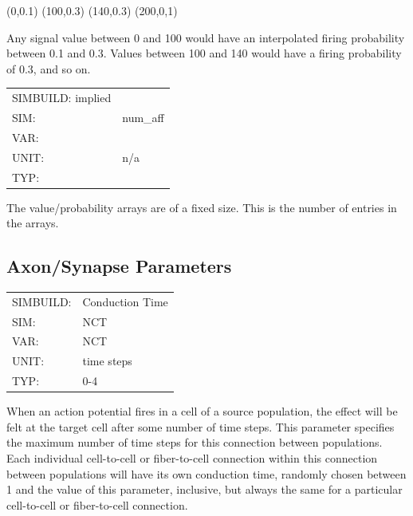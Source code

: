 \documentclass[12pt,openany,oneside]{book}
\begin{document}
(0,0.1) (100,0.3) (140,0.3) (200,0,1)

Any signal value between 0 and 100 would have an interpolated firing
probability between 0.1 and 0.3. Values between 100 and 140 would have 
a firing probability of 0.3, and so on.

\begin{flushleft}
\begin{tabular}{@{}ll@{}}
SIMBUILD: implied\\
SIM: & num\_aff\\
VAR: &\\
UNIT: & n/a\\
TYP: &\\
\end{tabular}
\end{flushleft}
The value/probability arrays are of a fixed size. This is the number of 
entries in the arrays.


\subsection{Axon/Synapse Parameters}
\label{Axon Parameters}

\begin{flushleft}
\begin{tabular}{@{}ll@{}}
SIMBUILD: & Conduction Time\\
SIM: & NCT\\
VAR: & NCT\\
UNIT: & time steps\\
TYP: & 0-4\\
\end{tabular}
\end{flushleft}
\noindent
When an action potential fires in a cell of a source population, the
effect will be felt at the target cell after some number of time
steps. This parameter specifies the maximum number of time steps for
this connection between populations. Each individual cell-to-cell or
fiber-to-cell connection within this connection between populations
will have its own conduction time, randomly chosen between 1 and the
value of this parameter, inclusive, but always the same for a
particular cell-to-cell or fiber-to-cell connection.
\filbreak
\vspace{\baselineskip}
\end{document}
